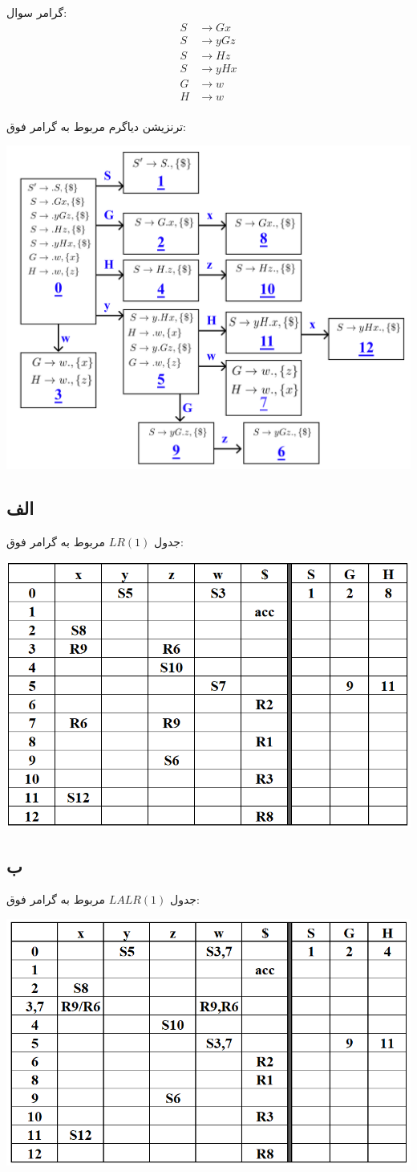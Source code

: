گرامر سوال:
\begin{align*}
	S&\rightarrow Gx \\
	S&\rightarrow yGz \\
	S&\rightarrow Hz \\
	S&\rightarrow yHx \\
	G&\rightarrow w \\
	H&\rightarrow w \\
\end{align*}

ترنزیشن دیاگرم مربوط به گرامر فوق:

\qquad\qquad\qquad\includegraphics[width=0.7\linewidth]{figs/8.png}

\subsection*{الف}

جدول 
$LR(1)$
مربوط به گرامر فوق:

\qquad\qquad\qquad\qquad\qquad\includegraphics[width=0.5\linewidth]{figs/6.png}
\pagebreak

\subsection*{ب}

جدول 
$LALR(1)$
مربوط به گرامر فوق:

\qquad\qquad\qquad\qquad\qquad\includegraphics[width=0.5\linewidth]{figs/7.png}

